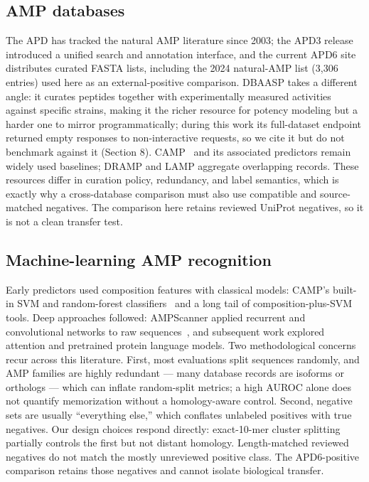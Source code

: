 \subsection{AMP databases}
The APD has tracked the natural AMP literature since 2003; the APD3
release~\cite{apd3} introduced a unified search and annotation interface, and
the current APD6 site distributes curated FASTA lists, including the 2024
natural-AMP list (3{,}306 entries) used here as an external-positive comparison. DBAASP
takes a different angle: it curates peptides together with experimentally
measured activities against specific strains, making it the richer resource
for potency modeling but a harder one to mirror programmatically; during this
work its full-dataset endpoint returned empty responses to non-interactive
requests, so we cite it but do not benchmark against it
(Section 8). CAMP~\cite{camp} and its associated predictors remain widely
used baselines; DRAMP and LAMP aggregate overlapping records. These resources
differ in curation policy, redundancy, and label semantics, which is exactly why a cross-database comparison must also use compatible and source-matched negatives. The comparison here retains reviewed UniProt negatives, so it is not a clean transfer test.

\subsection{Machine-learning AMP recognition}
Early predictors used composition features with classical models: CAMP's
built-in SVM and random-forest classifiers~\cite{camp} and a long tail of
composition-plus-SVM tools. Deep approaches followed: AMPScanner applied
recurrent and convolutional networks to raw sequences~\cite{ampscanner}, and
subsequent work explored attention and pretrained protein language models.
Two methodological concerns recur across this literature. First, most
evaluations split sequences randomly, and AMP families are highly redundant
--- many database records are isoforms or orthologs --- which can inflate random-split metrics; a high AUROC alone does not
quantify memorization without a homology-aware control.
Second, negative sets are usually ``everything else,'' which conflates
unlabeled positives with true negatives. Our design choices respond directly:
exact-10-mer cluster splitting partially controls the first but not distant homology. Length-matched reviewed negatives do not match the mostly unreviewed positive class. The APD6-positive comparison retains those negatives and cannot isolate biological transfer.

